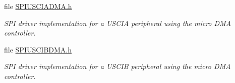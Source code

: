 \begin{DoxyCompactItemize}
file \hyperlink{_s_p_i_u_s_c_i_a_d_m_a_8h}{S\+P\+I\+U\+S\+C\+I\+A\+D\+M\+A.\+h}
\begin{DoxyCompactList}\small\item\em S\+P\+I driver implementation for a U\+S\+C\+I\+A peripheral using the micro D\+M\+A controller. \end{DoxyCompactList}\item 
file \hyperlink{_s_p_i_u_s_c_i_b_d_m_a_8h}{S\+P\+I\+U\+S\+C\+I\+B\+D\+M\+A.\+h}
\begin{DoxyCompactList}\small\item\em S\+P\+I driver implementation for a U\+S\+C\+I\+B peripheral using the micro D\+M\+A controller. \end{DoxyCompactList}\end{DoxyCompactItemize}
